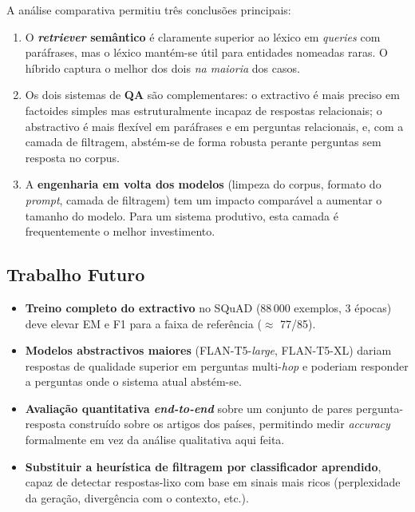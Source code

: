 \documentclass[11pt,a4paper]{article}
\begin{document}
A análise comparativa permitiu três conclusões principais:

\begin{enumerate}[noitemsep]
    \item O \textbf{\emph{retriever} semântico} é claramente superior ao léxico em \emph{queries} com paráfrases, mas o léxico mantém-se útil para entidades nomeadas raras. O híbrido captura o melhor dos dois \emph{na maioria} dos casos.
    \item Os dois sistemas de \textbf{QA} são complementares: o extractivo é mais preciso em factoides simples mas estruturalmente incapaz de respostas relacionais; o abstractivo é mais flexível em paráfrases e em perguntas relacionais, e, com a camada de filtragem, abstém-se de forma robusta perante perguntas sem resposta no corpus.
    \item A \textbf{engenharia em volta dos modelos} (limpeza do corpus, formato do \emph{prompt}, camada de filtragem) tem um impacto comparável a aumentar o tamanho do modelo. Para um sistema produtivo, esta camada é frequentemente o melhor investimento.
\end{enumerate}

\subsection*{Trabalho Futuro}

\begin{itemize}[noitemsep]
    \item \textbf{Treino completo do extractivo} no SQuAD (88\,000 exemplos, 3 épocas) deve elevar EM e F1 para a faixa de referência ($\approx$ 77/85).
    \item \textbf{Modelos abstractivos maiores} (FLAN-T5-\emph{large}, FLAN-T5-XL) dariam respostas de qualidade superior em perguntas multi-\emph{hop} e poderiam responder a perguntas onde o sistema atual abstém-se.
    \item \textbf{Avaliação quantitativa \emph{end-to-end}} sobre um conjunto de pares pergunta-resposta construído sobre os artigos dos países, permitindo medir \emph{accuracy} formalmente em vez da análise qualitativa aqui feita.
    \item \textbf{Substituir a heurística de filtragem por classificador aprendido}, capaz de detectar respostas-lixo com base em sinais mais ricos (perplexidade da geração, divergência com o contexto, etc.).
\end{itemize}
\end{document}
